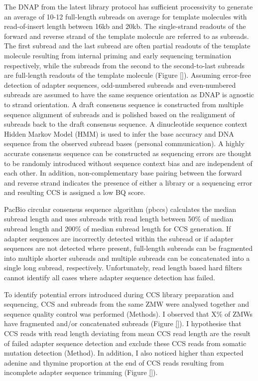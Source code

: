 The DNAP from the latest library protocol has sufficient processivity to generate an average of 10-12 full-length subreads on average for template molecules with read-of-insert length between 16kb and 20kb. The single-strand readouts of the forward and reverse strand of the template molecule are referred to as subreads. The first subread and the last subread are often partial readouts of the template molecule resulting from internal priming and early sequencing termination respectively, while the subreads from the second to the second-to-last subreads are full-length readouts of the template molecule (Figure \ref{}). Assuming error-free detection of adapter sequences, odd-numbered subreads and even-numbered subreads are assumed to have the same sequence orientation as DNAP is agnostic to strand orientation. A draft consensus sequence is constructed from multiple sequence alignment of subreads and is polished based on the realignment of subreads back to the draft consensus sequence. A dinucleotide sequence context Hidden Markov Model (HMM) is used to infer the base accuracy and DNA sequence from the observed subread bases (personal communication). A highly accurate consensus sequence can be constructed as sequencing errors are thought to be randomly introduced without sequence context bias and are independent of each other. In addition, non-complementary base pairing between the forward and reverse strand indicates the presence of either a library or a sequencing error and resulting CCS is assigned a low BQ score. 

PacBio circular consensus sequence algorithm (pbccs) calculates the median subread length and uses subreads with read length between 50\% of median subread length and 200\% of median subread length for CCS generation. If adapter sequences are incorrectly detected within the subread or if adapter sequences are not detected where present, full-length subreads can be fragmented into multiple shorter subreads and multiple subreads can be concatenated into a single long subread, respectively. Unfortunately, read length based hard filters cannot identify all cases where adapter sequence detection has failed. 


To identify potential errors introduced during CCS library preparation and sequencing, CCS and subreads from the same ZMW were analysed together and sequence quality control was performed (Methods). I observed that X\% of ZMWs have fragmented and/or concatenated subreads (Figure \ref{}). I hypothesise that CCS reads with read length deviating from mean CCS read length are the result of failed adapter sequence detection and exclude these CCS reads from somatic mutation detection (Method). In addition, I also noticed higher than expected adenine and thymine proportion at the end of CCS reads resulting from incomplete adapter sequence trimming (Figure \ref{}).


